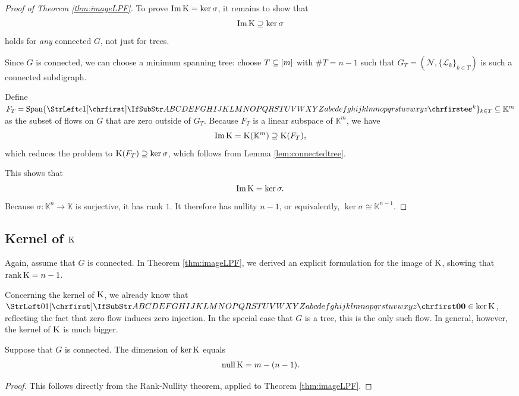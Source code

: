\documentclass[main.tex]{subfiles}
\begin{document}
\begin{proof}[Proof of Theorem \ref{thm:imageLPF}]
To prove $\operatorname{Im} \text{\textup{K}} = \ker \sigma$, it remains to show that
\begin{gather}
\operatorname{Im} \text{\textup{K}} \supseteq \ker \sigma
\end{gather}
holds for \emph{any} connected $G$, not just for trees.

Since $G$ is connected, we can choose a minimum spanning tree: choose $T \subseteq [m]$ with $\# T = n-1$ such that $G_T=(\mathcal{N}, \{\mathcal{L}_k\}_{k \in T})$ is such a connected subdigraph.

Define $F_T = \linspan \{\mat{e}^k\}_{k \in T} \subseteq \mathbb{K}^m$ as the subset of flows on $G$ that are zero outside of $G_T$. Because $F_T$ is a linear subspace of $\mathbb{K}^m$, we have
$$\operatorname{Im} \text{\textup{K}} = \text{\textup{K}} (\mathbb{K}^m) \supseteq \text{\textup{K}}(F_T),$$
which reduces the problem to $\text{\textup{K}}(F_T) \supseteq \ker \sigma$, which follows from Lemma \ref{lem:connectedtree}.

This shows that
\begin{gather*}
    \operatorname{Im} \text{\textup{K}} = \ker \sigma.
\end{gather*}
Because $\sigma : \mathbb{K}^n \rightarrow \mathbb{K}$ is surjective, it has rank $1$. It therefore has nullity $n-1$, or equivalently, $\ker \sigma \cong \mathbb{K}^{n-1}$.
\end{proof}









\subsection{Kernel of $\mathbf{\text{\textup{K}}}$}

Again, assume that $G$ is connected. In Theorem \ref{thm:imageLPF}, we derived an explicit formulation for the image of $\text{\textup{K}}$, showing that $\operatorname{rank} \text{\textup{K}} = n-1$.

Concerning the kernel of $\text{\textup{K}}$, we already know that $\mat{0} \in \ker \FRT$, reflecting the fact that zero flow induces zero injection. In the special case that $G$ is a tree, this is the only such flow. In general, however, the kernel of $\text{\textup{K}}$ is much bigger.

\begin{proposition}\label{prop:nullityLPF}
Suppose that $G$ is connected. The dimension of $\ker \text{\textup{K}}$ equals
\begin{gather*}
    \operatorname{null} \text{\textup{K}} = m - (n - 1).
\end{gather*}
\end{proposition}
\begin{proof}
This follows directly from the Rank-Nullity theorem, applied to Theorem \ref{thm:imageLPF}.
\end{proof}
\end{document}
